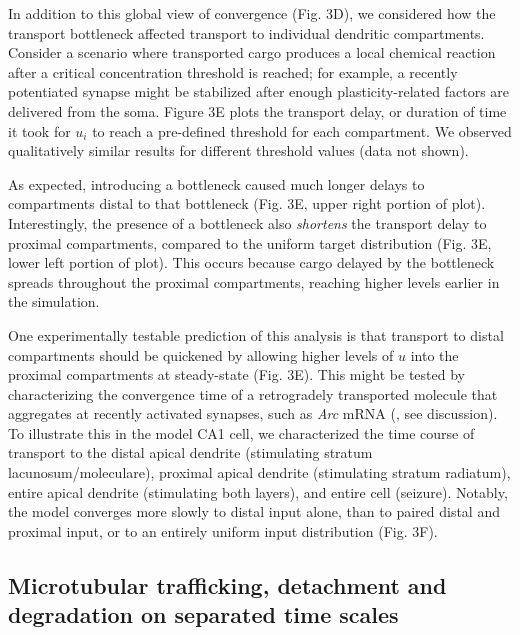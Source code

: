 \documentclass[11pt]{wlpeerj}
\begin{document}
In addition to this global view of convergence (Fig. 3D), we considered how the transport bottleneck affected transport to individual dendritic compartments.
Consider a scenario where transported cargo produces a local chemical reaction after a critical concentration threshold is reached; for example, a recently potentiated synapse might be stabilized after enough plasticity-related factors are delivered from the soma.
Figure 3E plots the transport delay, or duration of time it took for $u_i$ to reach a pre-defined threshold for each compartment.
We observed qualitatively similar results for different threshold values (data not shown).

As expected, introducing a bottleneck caused much longer delays to compartments distal to that bottleneck (Fig. 3E, upper right portion of plot).
Interestingly, the presence of a bottleneck also \textit{shortens} the transport delay to proximal compartments, compared to the uniform target distribution (Fig. 3E, lower left portion of plot).
This occurs because cargo delayed by the bottleneck spreads throughout the proximal compartments, reaching higher levels earlier in the simulation.

One experimentally testable prediction of this analysis is that transport to distal compartments should be quickened by allowing higher levels of $u$ into the proximal compartments at steady-state (Fig. 3E).
This might be tested by characterizing the convergence time of a retrogradely transported molecule that aggregates at recently activated synapses, such as \textit{Arc} mRNA (\citet{Steward_1998}, see discussion).
To illustrate this in the model CA1 cell, we characterized the time course of transport to the distal apical dendrite (stimulating stratum lacunosum/moleculare), proximal apical dendrite (stimulating stratum radiatum), entire apical dendrite (stimulating both layers), and entire cell (seizure). Notably, the model converges more slowly to distal input alone, than to paired distal and proximal input, or to an entirely uniform input distribution (Fig. 3F).

\subsection*{Microtubular trafficking, detachment and degradation on separated time scales}
\end{document}
